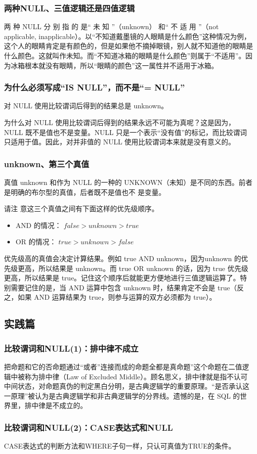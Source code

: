 \subsubsection*{两种NULL、三值逻辑还是四值逻辑}
两 种 NULL 分 别 指 的 是“ 未 知 ”（unknown） 和“ 不 适 用 ”（not applicable, inapplicable）。以“不知道戴墨镜的人眼睛是什么颜色”这种情况为例，这个人的眼睛肯定是有颜色的，但是如果他不摘掉眼镜，别人就不知道他的眼睛是什么颜色。这就叫作未知。而“不知道冰箱的眼睛是什么颜色”则属于“不适用”。因为冰箱根本就没有眼睛，所以“眼睛的颜色”这一属性并不适用于冰箱。


\subsubsection*{为什么必须写成“IS NULL”，而不是“= NULL”}
对 NULL 使用比较谓词后得到的结果总是 unknown。

为什么对 NULL 使用比较谓词后得到的结果永远不可能为真呢？这是因为，NULL 既不是值也不是变量。NULL 只是一个表示“没有值”的标记，而比较谓词只适用于值。因此，对并非值的 NULL 使用比较谓词本来就是没有意义的。
\subsubsection*{unknown、第三个真值}
真值 unknown 和作为 NULL 的一种的 UNKNOWN（未知）是不同的东西。前者是明确的布尔型的真值，后者既不是值也不
是变量。

请注
意这三个真值之间有下面这样的优先级顺序。
\begin{itemize}
    \item  AND 的情况： $false > unknown > true$
    \item OR 的情况： $true > unknown > false$
\end{itemize}
优先级高的真值会决定计算结果。例如 true AND unknown，因为unknown 的优先级更高，所以结果是 unknown。而 true OR unknown 的话，因为 true 优先级更高，所以结果是 true。记住这个顺序后就能更方便地进行三值逻辑运算了。特别需要记住的是，当 AND 运算中包含 unknown 时，结果肯定不会是 true（反之，如果 AND 运算结果为 true，则参与运算的双方必须都为 true）。

\subsection{实践篇}
\subsubsection*{比较谓词和NULL(1)：排中律不成立}
把命题和它的否命题通过“或者”连接而成的命题全都是真命题”这个命题在二值逻辑中被称为排中律（Law of Excluded Middle）。顾名思义，排中律就是指不认可中间状态，对命题真伪的判定黑白分明，是古典逻辑学的重要原理。“是否承认这一原理”被认为是古典逻辑学和非古典逻辑学的分界线。遗憾的是，在 SQL 的世界里，排中律是不成立的。
\subsubsection*{比较谓词和NULL(2)：CASE表达式和NULL}
CASE表达式的判断方法和WHERE子句一样，只认可真值为TRUE的条件。
